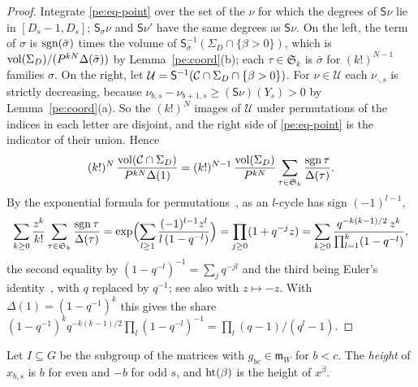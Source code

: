 \documentclass[10pt]{amsart}
\theoremstyle{definition}
\theoremstyle{remark}
\providecommand{\pam}{\mathfrak m}
\begin{document}
\begin{proof}
Integrate \eqref{pe:eq-point} over the set of the $\nu$ for which the degrees of $\mathsf S\nu$ lie
in $[D_s-1,D_s]$; $\mathsf S_\sigma\nu$ and $\mathsf S\nu'$ have the same degrees as $\mathsf
S\nu$. On the left, the term of $\sigma$ is $\operatorname{sgn}(\bar\sigma)$ times the volume of $\mathsf
S_\sigma^{-1}(\Sigma_D\cap\{\beta>0\})$, which is $\operatorname{vol}(\Sigma_D)/(P^{kN}\Delta(\bar\sigma))$ by
Lemma~\ref{pe:coord}(b); each $\tau\in\mathfrak S_k$ is $\bar\sigma$ for $(k!)^{N-1}$ families
$\sigma$. On the right, let $\mathcal U=\mathsf S^{-1}(\mathcal C\cap\Sigma_D\cap\{\beta>0\})$. For
$\nu\in\mathcal U$ each $\nu_{\cdot,s}$ is strictly decreasing, because $\nu_{b,s}-\nu_{b+1,s}\ge
(\mathsf S\nu)(Y_s)>0$ by Lemma~\ref{pe:coord}(a). So the $(k!)^N$ images of $\mathcal U$ under
permutations of the indices in each letter are disjoint, and the right side of
\eqref{pe:eq-point} is the indicator of their union. Hence
\[
(k!)^N\,\frac{\operatorname{vol}(\mathcal C\cap\Sigma_D)}{P^{kN}\Delta(1)}=(k!)^{N-1}\,\frac{\operatorname{vol}(\Sigma_D)}{P^{kN}}
\sum_{\tau\in\mathfrak S_k}\frac{\operatorname{sgn}\tau}{\Delta(\tau)} .
\]
By the exponential formula for permutations~\cite[Cor.~5.1.9]{StanleyEC2}, as an $l$-cycle has sign
$(-1)^{l-1}$,
\begin{equation}\label{pe:eq-euler}
\sum_{k\ge0}\frac{z^k}{k!}\sum_{\tau\in\mathfrak S_k}\frac{\operatorname{sgn}\tau}{\Delta(\tau)}
=\exp\Bigl(\sum_{l\ge1}\frac{(-1)^{l-1}z^l}{l\,(1-q^{-l})}\Bigr)=\prod_{j\ge0}(1+q^{-j}z)
=\sum_{k\ge0}\frac{q^{-k(k-1)/2}\,z^k}{\prod_{l=1}^k(1-q^{-l})},
\end{equation}
the second equality by $(1-q^{-l})^{-1}=\sum_jq^{-jl}$ and the third being Euler's
identity~\cite{AndrewsPartitions}, \cite[Ch.~I, \S2, Example~4]{Macdonald} with $q$ replaced by $q^{-1}$; see also \cite[(17.5.1)]{pe-DLMF17} with $z\mapsto -z$. With $\Delta(1)=(1-q^{-1})^k$ this gives the
share $(1-q^{-1})^kq^{-k(k-1)/2}\prod_l(1-q^{-l})^{-1}=\prod_l(q-1)/(q^l-1)$.
\end{proof}

Let $I\subseteq G$ be the subgroup of the matrices with $g_{bc}\in\pam_W$ for $b<c$. The
\emph{height} of $x_{b,s}$ is $b$ for even and $-b$ for odd $s$, and $\operatorname{ht}(\beta)$ is the height
of $x^\beta$.
\end{document}
